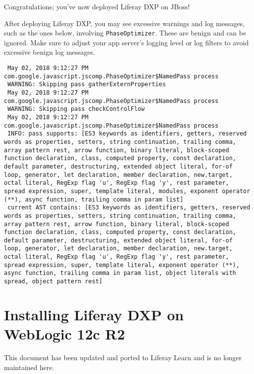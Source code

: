 Congratulations; you've now deployed Liferay DXP on JBoss!

\noindent\hrulefill

After deploying Liferay DXP, you may see excessive warnings and log
messages, such as the ones below, involving \texttt{PhaseOptimizer}.
These are benign and can be ignored. Make sure to adjust your app
server's logging level or log filters to avoid excessive benign log
messages.

\begin{verbatim}
 May 02, 2018 9:12:27 PM com.google.javascript.jscomp.PhaseOptimizer$NamedPass process
 WARNING: Skipping pass gatherExternProperties
 May 02, 2018 9:12:27 PM com.google.javascript.jscomp.PhaseOptimizer$NamedPass process
 WARNING: Skipping pass checkControlFlow
 May 02, 2018 9:12:27 PM com.google.javascript.jscomp.PhaseOptimizer$NamedPass process
 INFO: pass supports: [ES3 keywords as identifiers, getters, reserved words as properties, setters, string continuation, trailing comma, array pattern rest, arrow function, binary literal, block-scoped function declaration, class, computed property, const declaration, default parameter, destructuring, extended object literal, for-of loop, generator, let declaration, member declaration, new.target, octal literal, RegExp flag 'u', RegExp flag 'y', rest parameter, spread expression, super, template literal, modules, exponent operator (**), async function, trailing comma in param list]
 current AST contains: [ES3 keywords as identifiers, getters, reserved words as properties, setters, string continuation, trailing comma, array pattern rest, arrow function, binary literal, block-scoped function declaration, class, computed property, const declaration, default parameter, destructuring, extended object literal, for-of loop, generator, let declaration, member declaration, new.target, octal literal, RegExp flag 'u', RegExp flag 'y', rest parameter, spread expression, super, template literal, exponent operator (**), async function, trailing comma in param list, object literals with spread, object pattern rest]
\end{verbatim}

\chapter{Installing Liferay DXP on WebLogic 12c
R2}\label{installing-liferay-dxp-on-weblogic-12c-r2}

{This document has been updated and ported to Liferay Learn and is no
longer maintained here.}

